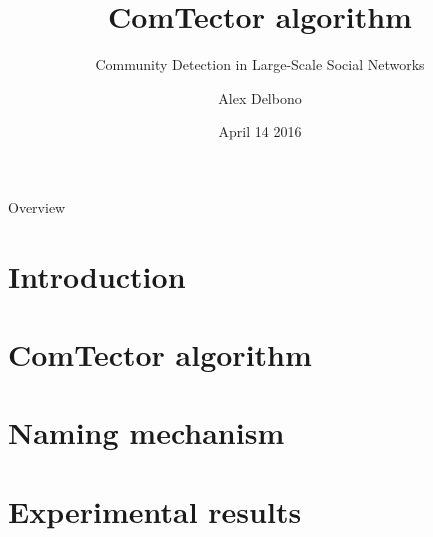 \documentclass{beamer}
\title[ComTector algorithm]{\textbf{ComTector algorithm}}
\subtitle{Community Detection in Large-Scale Social Networks}
\author[Alex Delbono]{Alex Delbono \\ }
\institute[Politecnico di Milano]{\href{mailto:alex.delbono@mail.polimi.it}{alex.delbono@mail.polimi.it}  
		\newline \newline \newline 
		Politecnico di Milano}
\date{April 14 2016}
\begin{document}
\begin{frame}
  \titlepage
\end{frame}

\begin{frame}{Overview}
\tableofcontents
\end{frame}


\section{Introduction}
\label{sec:introduction}


\section{ComTector algorithm}
\label{sec:comtector_algoritm}


\section{Naming mechanism}
\label{sec:naming_mechanism}


\section{Experimental results}
\label{sec:experimental_results}


\end{document}
